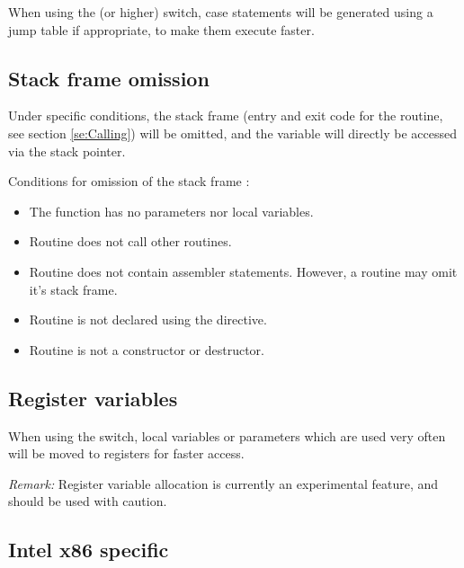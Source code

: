 \documentclass{report}
\begin{document}
When using the  (or higher) switch, case statements will be
generated using a jump table if appropriate, to make them execute
faster.

\subsection{ Stack frame omission }

Under specific conditions, the stack frame (entry and exit code for
the routine, see section \ref{se:Calling}) will be omitted, and the
variable will directly be accessed via the stack pointer.

Conditions for omission of the stack frame :

\begin{itemize}
\item The function has no parameters nor local variables.
\item Routine does not call other routines.
\item Routine does not contain assembler statements. However, 
a  routine may omit it's stack frame.
\item Routine is not declared using the  directive.
\item Routine is not a constructor or destructor.
\end{itemize}

\subsection{ Register variables }

When using the  switch, local variables or parameters
which are used very often will be moved to registers for faster
access.

\emph{ Remark: } Register variable allocation is currently
an experimental feature, and should be used with caution.

\subsection{ Intel x86 specific }
\end{document}
